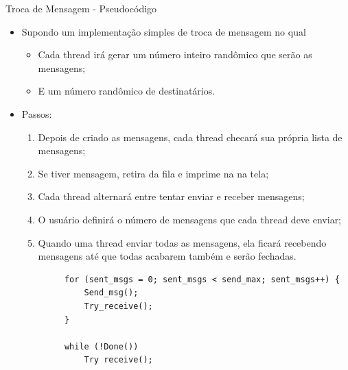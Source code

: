 	\begin{frame}[fragile]{Troca de Mensagem -  Pseudocódigo}
		\begin{itemize}
			\item Supondo um implementação simples de troca de mensagem no qual
			\begin{itemize}
				\item Cada thread irá gerar um número inteiro randômico que serão as mensagens;
				\item E um número randômico de destinatários.
			\end{itemize}
			\item Passos:
			\begin{enumerate}
				\item Depois de criado as mensagens, cada thread checará sua própria lista de mensagens;
				\item Se tiver mensagem, retira da fila e imprime na na tela;
				\item Cada thread alternará entre tentar enviar e receber mensagens;
				\item O usuário definirá o número de mensagens que cada thread deve enviar;
				\item Quando uma thread enviar todas as mensagens, ela ficará recebendo mensagens até que todas acabarem também e serão fechadas.
			\end{enumerate}
		\end{itemize}
				\pause
		\begin{verbatim}
			for (sent_msgs = 0; sent_msgs < send_max; sent_msgs++) { 
				Send_msg();
				Try_receive();
			}
			
			while (!Done()) 
				Try receive();
		\end{verbatim}
\end{frame}

